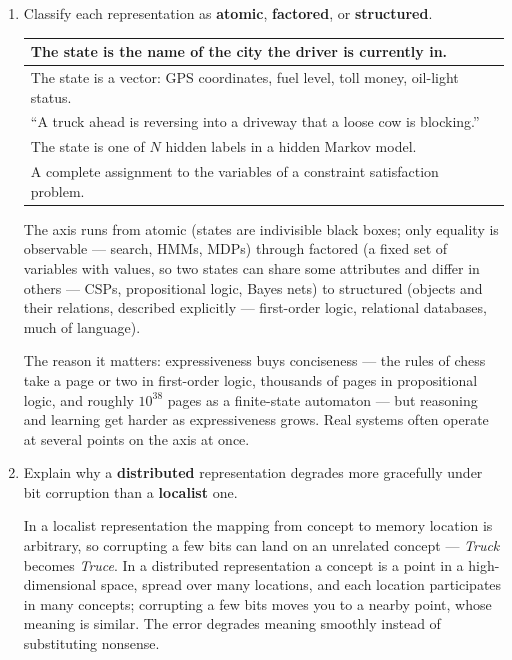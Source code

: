 \begin{enumerate}
\item Classify each representation as \textbf{atomic}, \textbf{factored}, or
\textbf{structured}.

\begin{center}
\renewcommand{\arraystretch}{1.9}
\begin{tabular}{p{9.5cm}|p{4.5cm}}
\toprule
The state is the name of the city the driver is currently in. & \A{Atomic} \\
\hline
The state is a vector: GPS coordinates, fuel level, toll money, oil-light status. & \A{Factored} \\
\hline
``A truck ahead is reversing into a driveway that a loose cow is blocking.'' & \A{Structured} \\
\hline
The state is one of $N$ hidden labels in a hidden Markov model. & \A{Atomic} \\
\hline
A complete assignment to the variables of a constraint satisfaction problem. & \A{Factored} \\
\bottomrule
\end{tabular}
\end{center}

\begin{sol}
The axis runs from atomic (states are indivisible black boxes; only equality is observable ---
search, HMMs, MDPs) through factored (a fixed set of variables with values, so two states can
share some attributes and differ in others --- CSPs, propositional logic, Bayes nets) to
structured (objects and their relations, described explicitly --- first-order logic, relational
databases, much of language).

The reason it matters: expressiveness buys conciseness --- the rules of chess take a page or
two in first-order logic, thousands of pages in propositional logic, and roughly $10^{38}$
pages as a finite-state automaton --- but reasoning and learning get harder as expressiveness
grows. Real systems often operate at several points on the axis at once.
\end{sol}

\item Explain why a \textbf{distributed} representation degrades more gracefully under bit
corruption than a \textbf{localist} one.
\ansspace{3.0cm}
\begin{sol}
In a localist representation the mapping from concept to memory location is arbitrary, so
corrupting a few bits can land on an unrelated concept --- \textit{Truck} becomes
\textit{Truce}. In a distributed representation a concept is a point in a
high-dimensional space, spread over many locations, and each location participates in many
concepts; corrupting a few bits moves you to a nearby point, whose meaning is similar. The
error degrades meaning smoothly instead of substituting nonsense.
\end{sol}


\end{enumerate}
